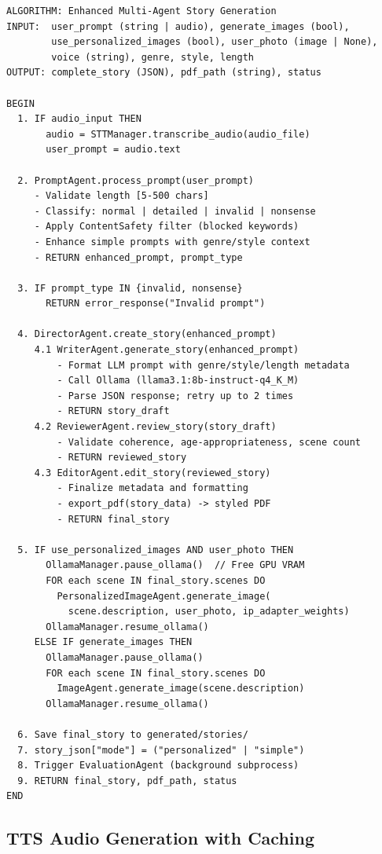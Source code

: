 \begin{verbatim}
ALGORITHM: Enhanced Multi-Agent Story Generation
INPUT:  user_prompt (string | audio), generate_images (bool),
        use_personalized_images (bool), user_photo (image | None),
        voice (string), genre, style, length
OUTPUT: complete_story (JSON), pdf_path (string), status

BEGIN
  1. IF audio_input THEN
       audio = STTManager.transcribe_audio(audio_file)
       user_prompt = audio.text
  
  2. PromptAgent.process_prompt(user_prompt)
     - Validate length [5-500 chars]
     - Classify: normal | detailed | invalid | nonsense
     - Apply ContentSafety filter (blocked keywords)
     - Enhance simple prompts with genre/style context
     - RETURN enhanced_prompt, prompt_type

  3. IF prompt_type IN {invalid, nonsense}
       RETURN error_response("Invalid prompt")

  4. DirectorAgent.create_story(enhanced_prompt)
     4.1 WriterAgent.generate_story(enhanced_prompt)
         - Format LLM prompt with genre/style/length metadata
         - Call Ollama (llama3.1:8b-instruct-q4_K_M)
         - Parse JSON response; retry up to 2 times
         - RETURN story_draft
     4.2 ReviewerAgent.review_story(story_draft)
         - Validate coherence, age-appropriateness, scene count
         - RETURN reviewed_story
     4.3 EditorAgent.edit_story(reviewed_story)
         - Finalize metadata and formatting
         - export_pdf(story_data) -> styled PDF
         - RETURN final_story

  5. IF use_personalized_images AND user_photo THEN
       OllamaManager.pause_ollama()  // Free GPU VRAM
       FOR each scene IN final_story.scenes DO
         PersonalizedImageAgent.generate_image(
           scene.description, user_photo, ip_adapter_weights)
       OllamaManager.resume_ollama()
     ELSE IF generate_images THEN
       OllamaManager.pause_ollama()
       FOR each scene IN final_story.scenes DO
         ImageAgent.generate_image(scene.description)
       OllamaManager.resume_ollama()

  6. Save final_story to generated/stories/
  7. story_json["mode"] = ("personalized" | "simple")
  8. Trigger EvaluationAgent (background subprocess)
  9. RETURN final_story, pdf_path, status
END
\end{verbatim}

\subsection{TTS Audio Generation with Caching}

